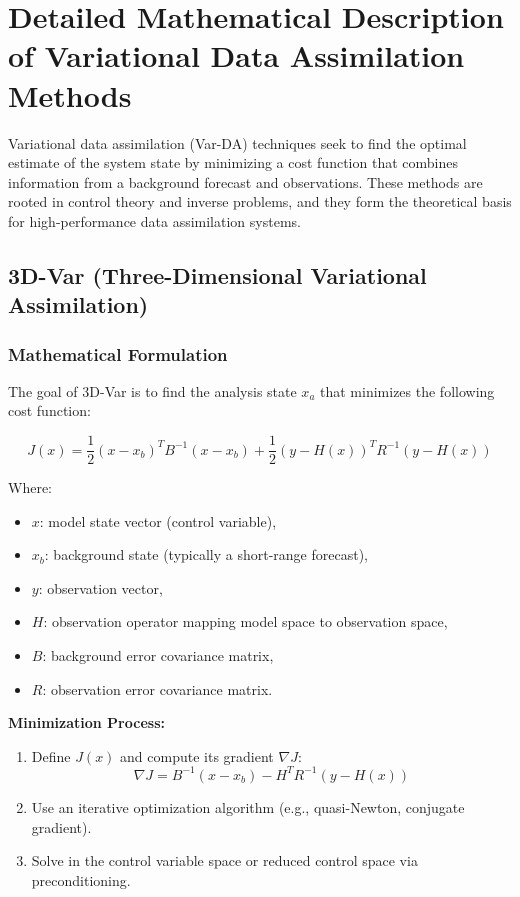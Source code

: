 \documentclass[a4paper]{article}
\begin{document}
\section{Detailed Mathematical Description of Variational Data Assimilation Methods}

Variational data assimilation (Var-DA) techniques seek to find the optimal estimate of the system state by minimizing a cost function that combines information from a background forecast and observations. These methods are rooted in control theory and inverse problems, and they form the theoretical basis for high-performance data assimilation systems.

\subsection{3D-Var (Three-Dimensional Variational Assimilation)}

\subsubsection*{Mathematical Formulation}

The goal of 3D-Var is to find the analysis state $x_a$ that minimizes the following cost function:

\[
J(x) = \frac{1}{2}(x - x_b)^T B^{-1}(x - x_b) + \frac{1}{2}(y - H(x))^T R^{-1}(y - H(x))
\]

Where:
\begin{itemize}
  \item $x$: model state vector (control variable),
  \item $x_b$: background state (typically a short-range forecast),
  \item $y$: observation vector,
  \item $H$: observation operator mapping model space to observation space,
  \item $B$: background error covariance matrix,
  \item $R$: observation error covariance matrix.
\end{itemize}

\textbf{Minimization Process:}
\begin{enumerate}
  \item Define $J(x)$ and compute its gradient $\nabla J$:
  \[
  \nabla J = B^{-1}(x - x_b) - H^T R^{-1}(y - H(x))
  \]
  \item Use an iterative optimization algorithm (e.g., quasi-Newton, conjugate gradient).
  \item Solve in the control variable space or reduced control space via preconditioning.
\end{enumerate}
\end{document}
